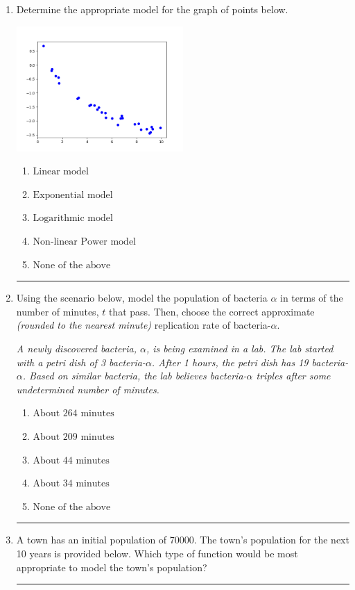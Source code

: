 \documentclass[14pt]{extbook}
\newcommand{\litem}[1]{\item#1\hspace*{-1cm}\rule{\textwidth}{0.4pt}}
\begin{document}
\begin{enumerate}
{\begin{enumerate}[label=\Alph*.]
\end{enumerate} }
\litem{
Determine the appropriate model for the graph of points below.
\begin{center}
    \includegraphics[width=0.5\textwidth]{../Figures/identifyModelGraph11CopyC.png}
\end{center}
\begin{enumerate}[label=\Alph*.]
\item \( \text{Linear model} \)
\item \( \text{Exponential model} \)
\item \( \text{Logarithmic model} \)
\item \( \text{Non-linear Power model} \)
\item \( \text{None of the above} \)

\end{enumerate} }
\litem{
Using the scenario below, model the population of bacteria $\alpha$ in terms of the number of minutes, $t$ that pass. Then, choose the correct approximate \textit{(rounded to the nearest minute)} replication rate of bacteria-$\alpha$.
\begin{center}
    \textit{ A newly discovered bacteria, $\alpha$, is being examined in a lab. The lab started with a petri dish of 3 bacteria-$\alpha$. After 1 hours, the petri dish has 19 bacteria-$\alpha$. Based on similar bacteria, the lab believes bacteria-$\alpha$ triples after some undetermined number of minutes. }
\end{center}
\begin{enumerate}[label=\Alph*.]
\item \( \text{About } 264 \text{ minutes} \)
\item \( \text{About } 209 \text{ minutes} \)
\item \( \text{About } 44 \text{ minutes} \)
\item \( \text{About } 34 \text{ minutes} \)
\item \( \text{None of the above} \)

\end{enumerate} }
\litem{
A town has an initial population of 70000. The town's population for the next 10 years is provided below. Which type of function would be most appropriate to model the town's population?

}
\end{enumerate}
\end{document}
